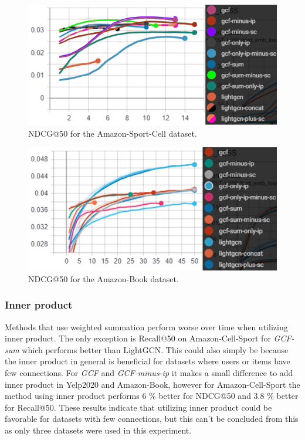 \begin{figure}[]
    \includegraphics[width=\linewidth]{figures/amazon-cell-sport-gcf-all-ndcg.png}
    \caption{NDCG@50 for the Amazon-Sport-Cell dataset.}
    \label{fig:GCF-NDCG-ablation-study-amazon-cell-sport}
\end{figure}
\begin{figure}[]
    \includegraphics[width=\linewidth]{figures/amazon-book-gcf-all-ndcg.png}
    \caption{NDCG@50 for the Amazon-Book dataset.}
    \label{fig:GCF-NDCG-ablation-study-amazon-book}
\end{figure}

\subsubsection{Inner product}
Methods that use weighted summation perform worse over time when utilizing inner product.
The only exception is Recall@50 on Amazon-Cell-Sport for \textit{GCF-sum} which performs better than LightGCN.
This could also simply be because the inner product in general is beneficial for datasets where users or items have few connections.
For \textit{GCF} and \textit{GCF-minus-ip} it makes a small difference to add inner product in Yelp2020 and Amazon-Book, however for Amazon-Cell-Sport the method using inner product performs 6 \% better for NDCG@50 and 3.8 \% better for Recall@50.
These results indicate that utilizing inner product could be favorable for datasets with few connections, but this can't be concluded from this as only three datasets were used in this experiment.

